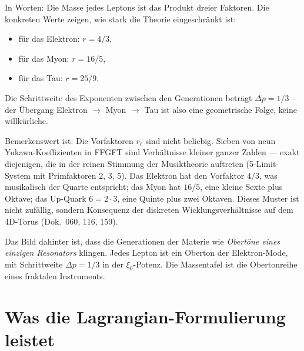\medskip\noindent

In Worten: Die Masse jedes Leptons ist das Produkt dreier Faktoren.
Die konkreten Werte zeigen, wie stark die Theorie eingeschränkt ist:
\begin{itemize}
  \item für das Elektron: $r = 4/3$,
  \item für das Myon: $r = 16/5$,
  \item für das Tau: $r = 25/9$.
\end{itemize}
Die Schrittweite des Exponenten zwischen den Generationen beträgt
$\Delta p = 1/3$ -- der Übergang Elektron $\to$ Myon $\to$ Tau ist
also eine geometrische Folge, keine willkürliche.

Bemerkenswert ist: Die Vorfaktoren $r_\ell$ sind nicht beliebig.
Sieben von neun Yukawa-Koeffizienten in FFGFT sind Verhältnisse
kleiner ganzer Zahlen --- exakt diejenigen, die in der reinen
Stimmung der Musiktheorie auftreten (5-Limit-System mit Primfaktoren
2, 3, 5). Das Elektron hat den Vorfaktor $4/3$, was musikalisch der
Quarte entspricht; das Myon hat $16/5$, eine kleine Sexte plus
Oktave; das Up-Quark $6 = 2 \cdot 3$, eine Quinte plus zwei Oktaven.
Dieses Muster ist nicht zufällig, sondern Konsequenz der diskreten
Wicklungsverhältnisse auf dem 4D-Torus (Dok.~060, 116, 159).

Das Bild dahinter ist, dass die Generationen der Materie wie
\emph{Obertöne eines einzigen Resonators} klingen. Jedes Lepton ist
ein Oberton der Elektron-Mode, mit Schrittweite $\Delta p = 1/3$ in
der $\xi_0$-Potenz. Die Massentafel ist die Obertonreihe eines
fraktalen Instruments.

\section{Was die Lagrangian-Formulierung leistet}

